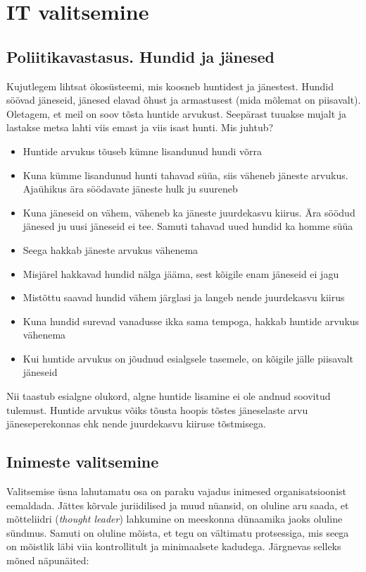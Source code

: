 \documentclass{article}
\begin{document}
\section{IT valitsemine}
\subsection{Poliitikavastasus. Hundid ja jänesed}
Kujutlegem lihtsat ökosüsteemi, mis koosneb huntidest ja jänestest. Hundid söövad jäneseid, jänesed elavad õhust ja armastusest (mida mõlemat on piisavalt). Oletagem, et meil on soov tõsta huntide arvukust. Seepärast tuuakse mujalt ja lastakse metsa lahti viis emast ja viis isast hunti. Mis juhtub? 
\begin{itemize}
	\item Huntide arvukus tõuseb kümne lisandunud hundi võrra
	\item Kuna kümme lisandunud hunti tahavad süüa, siis väheneb jäneste arvukus. Ajaühikus ära söödavate jäneste hulk ju suureneb
	\item Kuna jäneseid on vähem, väheneb ka jäneste juurdekasvu kiirus. Ära söödud jänesed ju uusi jäneseid ei tee. Samuti tahavad uued hundid ka homme süüa
	\item Seega hakkab jäneste arvukus vähenema
	\item Misjärel hakkavad hundid nälga jääma, sest kõigile enam jäneseid ei jagu
	\item Mistõttu saavad hundid vähem järglasi ja langeb nende juurdekasvu kiirus
	\item Kuna hundid surevad vanadusse ikka sama tempoga, hakkab huntide arvukus vähenema
	\item Kui huntide arvukus on jõudnud esialgsele tasemele, on kõigile jälle piisavalt jäneseid 
\end{itemize}

Nii taastub esialgne olukord, algne huntide lisamine ei ole andnud soovitud tulemust. Huntide arvukus võiks tõusta hoopis tõstes jäneselaste arvu jäneseperekonnas ehk nende juurdekasvu kiiruse tõstmisega. 

\subsection{Inimeste valitsemine}
Valitsemise üsna lahutamatu osa on paraku vajadus inimesed organisatsioonist eemaldada. Jättes kõrvale juriidilised ja muud nüansid, on oluline aru saada, et mõtteliidri (\emph{thought leader}) lahkumine on meeskonna dünaamika jaoks oluline sündmus. Samuti on oluline mõista, et tegu on vältimatu protsessiga, mis seega on mõistlik läbi viia kontrollitult ja minimaalsete kadudega. Järgnevas selleks mõned näpunäited: 
\end{document}
